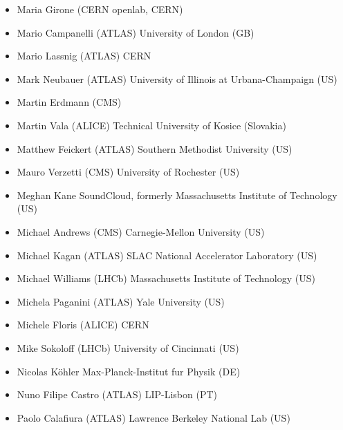 \begin{itemize}
 \item Maria Girone (CERN openlab, CERN)
 \item Mario Campanelli (ATLAS)
       \newline University of London (GB)
 \item Mario Lassnig (ATLAS)
       \newline CERN
 \item Mark Neubauer (ATLAS)
       \newline University of Illinois at Urbana-Champaign (US)
 \item Martin Erdmann (CMS)
 \item Martin Vala (ALICE)
       \newline Technical University of Kosice (Slovakia)
 \item Matthew Feickert (ATLAS)
       \newline Southern Methodist University (US)
 \item Mauro Verzetti (CMS)
       \newline  University of Rochester (US)
 \item Meghan Kane
       \newline SoundCloud, formerly Massachusetts Institute of Technology (US)
 \item Michael Andrews (CMS)
       \newline Carnegie-Mellon University (US)
 \item Michael Kagan (ATLAS)
       \newline SLAC National Accelerator Laboratory (US)
 \item Michael Williams (LHCb)
       \newline Massachusetts Institute of Technology (US)
 \item Michela Paganini (ATLAS)
       \newline Yale University (US)
 \item Michele Floris (ALICE)
       \newline CERN
 \item Mike Sokoloff (LHCb)
       \newline University of Cincinnati (US)
 \item Nicolas K{\"o}hler
       \newline Max-Planck-Institut fur Physik (DE)
 \item Nuno Filipe Castro (ATLAS)
       \newline LIP-Lisbon (PT)
 \item Paolo Calafiura (ATLAS)
       \newline Lawrence Berkeley National Lab (US)

\end{itemize}
